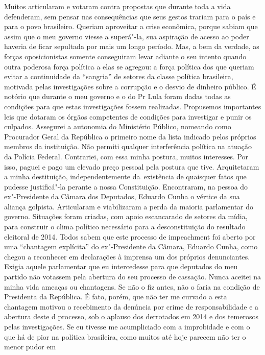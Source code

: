 Muitos articularam e votaram contra propostas que durante toda a vida
defenderam, sem pensar nas consequências que seus gestos trariam para o
país e para o povo brasileiro. Queriam aproveitar a crise econômica,
porque sabiam que assim que o meu governo viesse a superá"-la, sua
aspiração de acesso ao poder haveria de ficar sepultada por mais um
longo período. Mas, a bem da verdade, as forças oposicionistas somente
conseguiram levar adiante o seu intento quando outra poderosa força
política a elas se agregou: a força política dos que queriam evitar a
continuidade da ``sangria'' de setores da classe política brasileira,
motivada pelas investigações sobre a corrupção e o desvio de dinheiro
público. É notório que durante o meu governo e o do Pr Lula foram dadas
todas as condições para que estas investigações fossem realizadas.
Propusemos importantes leis que dotaram os órgãos competentes de
condições para investigar e punir os culpados. Assegurei a autonomia do
Ministério Público, nomeando como Procurador Geral da República o
primeiro nome da lista indicado pelos próprios membros da instituição.
Não permiti qualquer interferência política na atuação da Polícia
Federal. Contrariei, com essa minha postura, muitos interesses. Por
isso, paguei e pago um elevado preço pessoal pela postura que tive.
Arquitetaram a minha destituição, independentemente da~existência de
quaisquer fatos que pudesse justificá"-la perante a nossa Constituição.
Encontraram, na pessoa do ex"-Presidente da Câmara dos Deputados, Eduardo
Cunha o vértice da sua aliança golpista. Articularam e viabilizaram a
perda da maioria parlamentar do governo. Situações foram criadas, com
apoio escancarado de setores da mídia, para construir o clima político
necessário para a desconstituição do resultado eleitoral de 2014. Todos
sabem que este processo de impeachment foi aberto por uma ``chantagem
explícita'' do ex"-Presidente da Câmara, Eduardo Cunha, como chegou a
reconhecer em declarações à imprensa um dos próprios denunciantes.
Exigia aquele parlamentar que eu intercedesse para que deputados do meu
partido não votassem pela abertura do seu processo de cassação. Nunca
aceitei na minha vida ameaças ou chantagens. Se não o fiz antes, não o
faria na condição de Presidenta da República. É fato, porém, que não ter
me curvado a esta chantagem motivou o recebimento da denúncia por crime
de responsabilidade e a abertura deste d processo, sob o aplauso dos
derrotados em 2014 e dos temerosos pelas investigações. Se eu tivesse me
acumpliciado com a improbidade e com o que há de pior na política
brasileira, como muitos até hoje parecem não ter o menor pudor em
